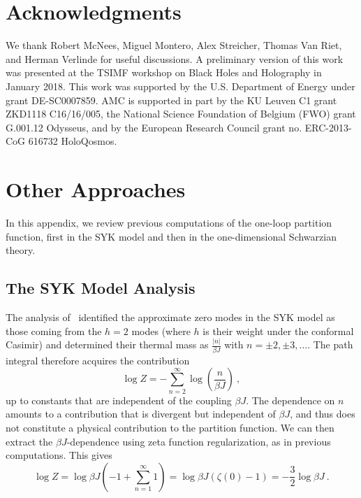 \documentclass[12pt]{article}
\begin{document}
\section*{Acknowledgments}
We thank Robert McNees, Miguel Montero, Alex Streicher, Thomas Van Riet, and Herman Verlinde for useful discussions.  A preliminary version of this work was presented at the TSIMF workshop on Black Holes and Holography in January 2018.  This work was supported by the U.S. Department of Energy under grant DE-SC0007859. AMC is supported in part by the KU Leuven C1 grant ZKD1118 C16/16/005, the National Science Foundation of Belgium (FWO) grant G.001.12 Odysseus, and by the European Research Council grant no. ERC-2013-CoG 616732 HoloQosmos.

\appendix

\section{Other Approaches}
\label{app:z}

In this appendix, we review previous computations of the one-loop partition function, first in the SYK model and then in the one-dimensional Schwarzian theory.

\subsection{The SYK Model Analysis}

The analysis of~\cite{Maldacena:2016hyu} identified the approximate zero modes in the SYK model as those coming from the $h=2$ modes (where $h$ is their weight under the conformal Casimir) and determined their 
thermal mass as $\frac{|n|}{\beta J}$ with $n=\pm 2, \pm 3,\ldots$. The path integral therefore acquires the contribution
\begin{equation}
	\log Z = -\sum_{n=2}^\infty \log\left(\frac{n}{\beta J}\right)~,
\end{equation}
up to constants that are independent of the coupling $\beta J$.  The dependence on $n$ amounts to a contribution that is divergent but independent of $\beta J$, 
and thus does not constitute a physical contribution to the partition function.  We can then extract the $\beta J$-dependence using zeta function regularization, as in previous computations. This gives
\begin{equation}
	\log Z = \log \beta J \left(-1 + \sum_{n=1}^\infty 1\right) = \log \beta J\left(\zeta(0) - 1\right) = -\frac{3}{2}\log \beta J~.
\label{eq:zsyk}
\end{equation}
\end{document}
